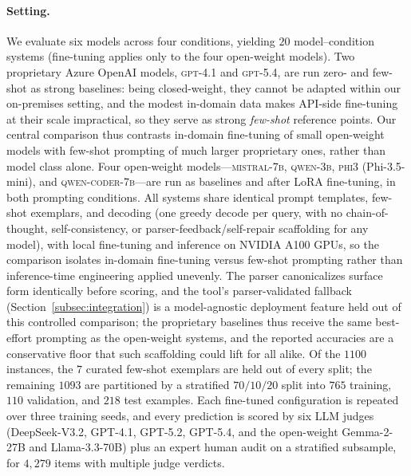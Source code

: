 \paragraph{Setting.}
We evaluate six models across four conditions, yielding $20$ model--condition systems (fine-tuning applies only to the four open-weight models). Two proprietary Azure OpenAI models, \textsc{gpt-4.1} and \textsc{gpt-5.4}, are run zero- and few-shot as strong baselines: being closed-weight, they cannot be adapted within our on-premises setting, and the modest in-domain data makes API-side fine-tuning at their scale impractical, so they serve as strong \emph{few-shot} reference points. Our central comparison thus contrasts in-domain fine-tuning of small open-weight models with few-shot prompting of much larger proprietary ones, rather than model class alone. Four open-weight models---\textsc{mistral-7b}, \textsc{qwen-3b}, \textsc{phi3} (Phi-3.5-mini), and \textsc{qwen-coder-7b}---are run as baselines and after LoRA fine-tuning, in both prompting conditions. All systems share identical prompt templates, few-shot exemplars, and decoding (one greedy decode per query, with no chain-of-thought, self-consistency, or parser-feedback/self-repair scaffolding for any model), with local fine-tuning and inference on NVIDIA A100 GPUs, so the comparison isolates in-domain fine-tuning versus few-shot prompting rather than inference-time engineering applied unevenly. The parser canonicalizes surface form identically before scoring, and the tool's parser-validated fallback (Section~\ref{subsec:integration}) is a model-agnostic deployment feature held out of this controlled comparison; the proprietary baselines thus receive the same best-effort prompting as the open-weight systems, and the reported accuracies are a conservative floor that such scaffolding could lift for all alike. Of the $1100$ instances, the $7$ curated few-shot exemplars are held out of every split; the remaining $1093$ are partitioned by a stratified $70/10/20$ split into $765$ training, $110$ validation, and $218$ test examples. Each fine-tuned configuration is repeated over three training seeds, and every prediction is scored by six LLM judges (DeepSeek-V3.2, GPT-4.1, GPT-5.2, GPT-5.4, and the open-weight Gemma-2-27B and Llama-3.3-70B) plus an expert human audit on a stratified subsample, for $4{,}279$ items with multiple judge verdicts.

